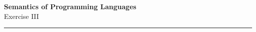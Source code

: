 \documentclass[10pt,a4paper]{exam} %
\begin{document}
\newcommand{\course}{Semantics of Programming Languages}
\newcommand{\week}{III}
\newcommand{\topics}{Data, Subtyping \& Objects, Semantic Equivalence, and Concurrency}

\everymath{\color{campurpledark}}
\everydisplay{\color{campurpledark}}




\marksnotpoints
\pointsdroppedatright
\marksnotpoints
\marginpointname{ \points}

\begin{center}
\LARGE {\textbf{\color{campurpledark} \course} }\\[-0.2cm]
\Large \color{campurpledark} Exercise \week\\
\end{center}

{\color{campurple}\hrule}

\newcommand{\metavar}[1]{{\color{campurple}#1}}

\vspace{0.5cm}
\end{document}
